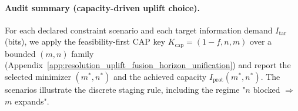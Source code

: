 \paragraph{Audit summary (capacity-driven uplift choice).} \AuditTag For each declared constraint scenario and each target information demand $I_{\mathrm{tar}}$ (bits), we apply the feasibility-first CAP key $K_{\mathrm{cap}}=(1-f, n, m)$ over a bounded $(m,n)$ family (Appendix~\ref{app:resolution_uplift_fusion_horizon_unification}) and report the selected minimizer $(m^\ast,n^\ast)$ and the achieved capacity $I_{\mathrm{prot}}(m^\ast,n^\ast)$. The scenarios illustrate the discrete staging rule, including the regime "$n$ blocked $\Rightarrow$ $m$ expands".